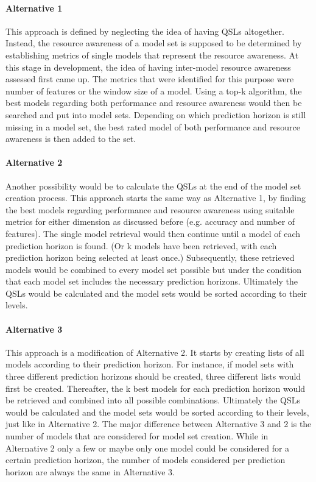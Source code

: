 \paragraph*{Alternative 1}
This approach is defined by neglecting the idea of having QSLs altogether. Instead, the resource awareness of a model set is supposed to be determined by establishing metrics of single models that represent the resource awareness. At this stage in development, the idea of having inter-model resource awareness assessed first came up. The metrics that were identified for this purpose were number of features or the window size of a model. Using a top-k algorithm, the best models regarding both performance and resource awareness would then be searched and put into model sets. Depending on which prediction horizon is still missing in a model set, the best rated model of both performance and resource awareness is then added to the set. 

\paragraph{Alternative 2}
Another possibility would be to calculate the QSLs at the end of the model set creation process. This approach starts the same way as Alternative 1, by finding the best models regarding performance and resource awareness using suitable metrics for either dimension as discussed before (e.g. accuracy and number of features). The single model retrieval would then continue until a model of each prediction horizon is found. (Or k models have been retrieved, with each prediction horizon being selected at least once.) Subsequently, these retrieved models would be combined to every model set possible but under the condition that each model set includes the necessary prediction horizons. Ultimately the QSLs would be calculated and the model sets would be sorted according to their levels.

\paragraph{Alternative 3}
This approach is a modification of Alternative 2. It starts by creating lists of all models according to their prediction horizon. For instance, if model sets with three different prediction horizons should be created, three different lists would first be created. Thereafter, the k best models for each prediction horizon would be retrieved and combined into all possible combinations. Ultimately the QSLs would be calculated and the model sets would be sorted according to their levels, just like in Alternative 2. The major difference between Alternative 3 and 2 is the number of models that are considered for model set creation. While in Alternative 2 only a few or maybe only one model could be considered for a certain prediction horizon, the number of models considered per prediction horizon are always the same in Alternative 3. 

